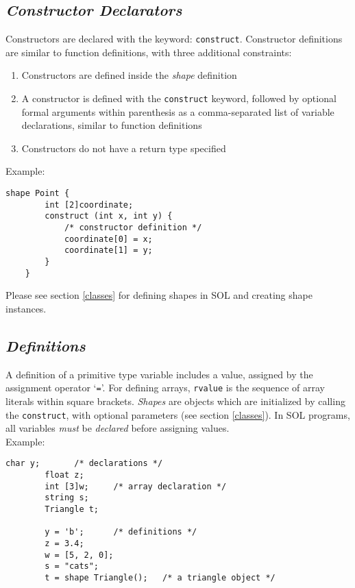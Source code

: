     \subsection{\textit{Constructor Declarators}}
    Constructors are declared with the keyword: \texttt{construct}. Constructor definitions are similar to function definitions, with three additional constraints: 
    \begin{enumerate}
        \itemsep0em
        \item Constructors are defined inside the \textit{shape} definition
        \item A constructor is defined with the \texttt{construct} keyword, followed by optional formal arguments within parenthesis as a comma-separated list of variable declarations, similar to function definitions
        \item Constructors do not have a return type specified
    \end{enumerate}
    Example:\\
    \begin{lstlisting}[style=sol]
    shape Point {
        int [2]coordinate;
        construct (int x, int y) {
            /* constructor definition */
            coordinate[0] = x;
            coordinate[1] = y;
        }
    }
    \end{lstlisting}
    Please see section \ref{classes} for defining shapes in SOL and creating shape instances.

    \subsection{\textit{Definitions}}
    A definition of a primitive type variable includes a value, assigned by the assignment operator `\texttt{=}'. For defining arrays, \texttt{rvalue} is the sequence of array literals within square brackets. \textit{Shapes} are objects which are initialized by calling the \texttt{construct}, with optional parameters (see section \ref{classes}). In SOL programs, all variables \textit{must} be \textit{declared} before assigning values.\\
    Example:\\
    \begin{lstlisting}[style=sol]
        char y;       /* declarations */
        float z;
        int [3]w;     /* array declaration */
        string s;
        Triangle t;

        y = 'b';      /* definitions */
        z = 3.4;
        w = [5, 2, 0];
        s = "cats";
        t = shape Triangle();   /* a triangle object */
    \end{lstlisting}

